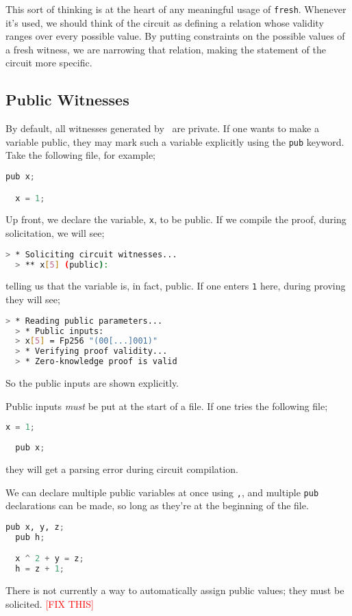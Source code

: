 This sort of thinking is at the heart of any meaningful usage of \lstinline{fresh}. Whenever it's used, we should think of the circuit as defining a relation whose validity ranges over every possible value. By putting constraints on the possible values of a fresh witness, we are narrowing that relation, making the statement of the circuit more specific.

\subsection{Public Witnesses}

By default, all witnesses generated by \vampir\ are private. If one wants to make a variable public, they may mark such a variable explicitly using the \lstinline|pub| keyword. Take the following file, for example;

\begin{lstlisting}[language=Python]
  pub x;

  x = 1;
\end{lstlisting}

Up front, we declare the variable, \lstinline|x|, to be public. If we compile the proof, during solicitation, we will see;

\begin{lstlisting}[language=bash]
  > * Soliciting circuit witnesses...
  > ** x[5] (public): 
\end{lstlisting}

telling us that the variable is, in fact, public. If one enters \lstinline|1| here, during proving they will see;

\begin{lstlisting}[language=bash]
  > * Reading public parameters...
  > * Public inputs:
  > x[5] = Fp256 "(00[...]001)"
  > * Verifying proof validity...
  > * Zero-knowledge proof is valid
\end{lstlisting}

So the public inputs are shown explicitly.

Public inputs \textit{must} be put at the start of a file. If one tries the following file;

\begin{lstlisting}[language=Python]
  x = 1;
  
  pub x;
\end{lstlisting}

they will get a parsing error during circuit compilation.

We can declare multiple public variables at once using \lstinline|,|, and multiple \lstinline|pub| declarations can be made, so long as they're at the beginning of the file.

\begin{lstlisting}[language=Python]
  pub x, y, z;
  pub h;

  x ^ 2 + y = z;
  h = z + 1;
\end{lstlisting}

There is not currently a way to automatically assign public values; they must be solicited. 
\textcolor{red}{[FIX THIS]}

